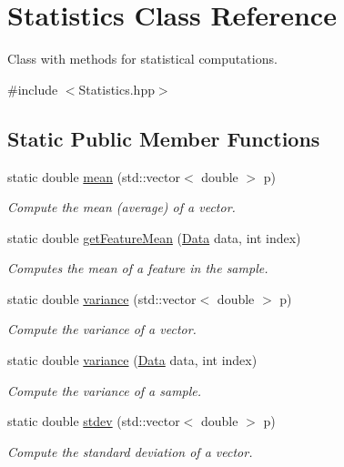 \hypertarget{class_statistics}{}\section{Statistics Class Reference}
\label{class_statistics}


Class with methods for statistical computations.  




{\ttfamily \#include $<$Statistics.\+hpp$>$}

\subsection*{Static Public Member Functions}
\begin{DoxyCompactItemize}
\item 
static double \hyperlink{class_statistics_ab121520f7556f75e295e04ff71f2af39}{mean} (std\+::vector$<$ double $>$ p)
\begin{DoxyCompactList}\small\item\em Compute the mean (average) of a vector. \end{DoxyCompactList}\item 
static double \hyperlink{class_statistics_a4201ed0f3f817591bcf18d8ba7bfc1e0}{get\+Feature\+Mean} (\hyperlink{class_data}{Data} data, int index)
\begin{DoxyCompactList}\small\item\em Computes the mean of a feature in the sample. \end{DoxyCompactList}\item 
static double \hyperlink{class_statistics_af3a74e0ab944341356b8afeb9fc0ecbd}{variance} (std\+::vector$<$ double $>$ p)
\begin{DoxyCompactList}\small\item\em Compute the variance of a vector. \end{DoxyCompactList}\item 
static double \hyperlink{class_statistics_a0390754b117a9b7a637b44992ed2ebf6}{variance} (\hyperlink{class_data}{Data} data, int index)
\begin{DoxyCompactList}\small\item\em Compute the variance of a sample. \end{DoxyCompactList}\item 
static double \hyperlink{class_statistics_a75435245095cd0fd54b2d57a6ae592da}{stdev} (std\+::vector$<$ double $>$ p)
\begin{DoxyCompactList}\small\item\em Compute the standard deviation of a vector. \end{DoxyCompactList}\item 

\end{DoxyCompactItemize}
